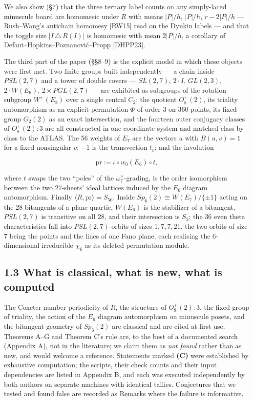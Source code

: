 \documentclass[
]{article}
\begin{document}
We also show (§7) that the three ternary label counts on any
simply-laced minuscule board are homomesic under \(R\) with means
\(|P|/h\), \(|P|/h\), \(r - 2|P|/h\) --- Rush--Wang's antichain homomesy
{[}RW15{]} read on the Dynkin labels --- and that the toggle size
\(|I \,\triangle\, R(I)|\) is homomesic with mean \(2|P|/h\), a
corollary of Defant--Hopkins--Poznanović--Propp {[}DHPP23{]}.

The third part of the paper (§§8--9) is the explicit model in which
these objects were first met. Two finite groups built independently ---
a chain inside \(PSL(2,7)\) and a tower of double covers ---
\(SL(2,7)\), \(2\cdot I\), \(GL(2,3)\), \(2\cdot W(E_6)\),
\(2 \times PGL(2,7)\) --- are exhibited as subgroups of the rotation
subgroup \(W^+(E_8)\) over a single central \(C_2\); the quotient
\(O_8^+(2)\), its triality automorphism as an explicit permutation
\(\Phi\) of order 3 on 360 points, its fixed group \(G_2(2)\) as an
exact intersection, and the fourteen outer conjugacy classes of
\(O_8^+(2){:}3\) are all constructed in one coordinate system and
matched class by class to the ATLAS. The 56 weights of \(E_7\) are the
vectors \(u\) with \(B(u,v)=1\) for a fixed nonsingular \(v\); \(-1\) is
the transvection \(t_v\); and the involution

\[\mathrm{pr} := \iota \circ w_0(E_6) \circ t,\]

where \(t\) swaps the two ``poles'' of the \(\omega_7^\vee\)-grading, is
the order isomorphism between the two 27-sheets' ideal lattices induced
by the \(E_6\) diagram automorphism. Finally
\(\langle R, \mathrm{pr} \rangle = S_{56}\). Inside
\(Sp_6(2) \cong W(E_7)/\{\pm1\}\) acting on the 28 bitangents of a plane
quartic, \(W(E_6)\) is the stabilizer of a bitangent, \(PSL(2,7)\) is
transitive on all 28, and their intersection is \(S_3\); the 36 even
theta characteristics fall into \(PSL(2,7)\)-orbits of sizes
\(1, 7, 7, 21\), the two orbits of size 7 being the points and the lines
of one Fano plane, each realising the 6-dimensional irreducible
\(\chi_6\) as its deleted permutation module.

\subsection{1.3 What is classical, what is new, what is
computed}\label{what-is-classical-what-is-new-what-is-computed}

The Coxeter-number periodicity of \(R\), the structure of
\(O_8^+(2){:}3\), the fixed group of triality, the action of the \(E_6\)
diagram automorphism on minuscule posets, and the bitangent geometry of
\(Sp_6(2)\) are classical and are cited at first use. Theorems A--G and
Theorem C's rule are, to the best of a documented search (Appendix A),
not in the literature; we claim them as \emph{not found} rather than as
new, and would welcome a reference. Statements marked \textbf{(C)} were
established by exhaustive computation; the scripts, their check counts
and their input dependencies are listed in Appendix B, and each was
executed independently by both authors on separate machines with
identical tallies. Conjectures that we tested and found false are
recorded as Remarks where the failure is informative.
\end{document}
